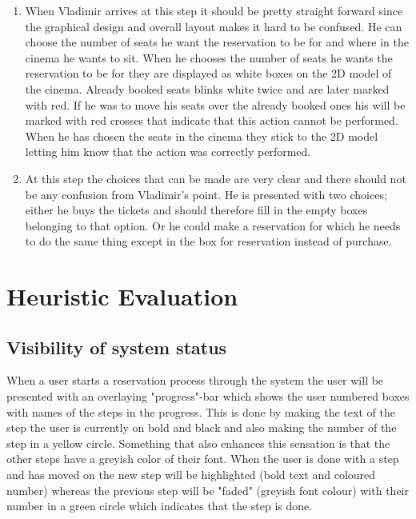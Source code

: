 \documentclass[a4paper,11pt]{article}
\begin{document}
\begin{enumerate}
\item 
When Vladimir arrives at this step it should be pretty straight forward since the graphical design and overall layout makes it hard to be confused. He can choose the number of seats he want the reservation to be for and where in the cinema he wants to sit. When he chooses the number of seats he wants the reservation to be for they are displayed as white boxes on the 2D model of the cinema. Already booked seats blinks white twice and are later marked with red. If he was to move his seats over the already booked ones his will be marked with red crosses that indicate that this action cannot be performed. When he has chosen the seats in the cinema they stick to the 2D model letting him know that the action was correctly performed. 

\item 
At this step the choices that can be made are very clear and there should not be any confusion from Vladimir’s point. He is presented with two choices; either he buys the tickets and should therefore fill in the empty boxes belonging to that option. Or he could make a reservation for which he needs to do the same thing except in the box for reservation instead of purchase. 

\end{enumerate}

\newpage
\section{Heuristic Evaluation}

\subsection{Visibility of system status} 
When a user starts a reservation process through the system the user will be presented with an overlaying "progress"-bar which shows the user numbered boxes with names of the steps in the progress. This is done by making the text of the step the user is currently on bold and black and also making the number of the step in a yellow circle. Something that also enhances this sensation is that the other steps have a greyish color of their font. When the user is done with a step and has moved on the new step will be highlighted (bold text and coloured number) whereas the previous step will be "faded" (greyish font colour) with their number in a green circle which indicates that the step is done.
\end{document}
